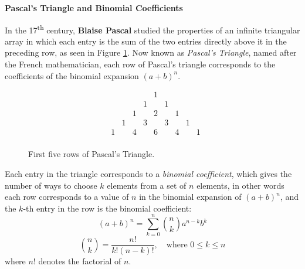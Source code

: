

\noindent \textbf{Pascal’s Triangle and Binomial Coefficients}
\vspace{0.5em}

In the 17\textsuperscript{th} century, \textbf{Blaise Pascal} studied the properties of an infinite triangular array in which each entry is the sum of the two entries directly above it in the preceding row, as seen in Figure \ref{fig:pascal_rows}. Now known as \textit{Pascal’s Triangle}, named after the French mathematician, each row of Pascal's triangle corresponds to the coefficients of the binomial expansion $(a + b)^n$.

\begin{figure}[H]
\centering
\[
\begin{array}{cccccccccc}
     &   &   &   &   & 1 &   &   &   &   \\
     &   &   &   & 1 &   & 1 &   &   &   \\
     &   &   & 1 &   & 2 &   & 1 &   &   \\
     &   & 1 &   & 3 &   & 3 &   & 1 &   \\
     & 1 &   & 4 &   & 6 &   & 4 &   & 1 \\
\end{array}
\]
\caption{First five rows of Pascal’s Triangle.}
\label{fig:pascal_rows}
\end{figure}

\vspace{-0.3cm}
Each entry in the triangle corresponds to a \textit{binomial coefficient}, which gives the number of ways to choose $k$ elements from a set of $n$ elements, in other words each row corresponds to a value of \(n\) in the binomial expansion of \((a + b)^n\), and the \(k\)-th entry in the row is the binomial coefficient:
\[
(a + b)^n = \sum_{k=0}^{n} \binom{n}{k} a^{n-k} b^k
\]
\[
\binom{n}{k} = \frac{n!}{k!(n-k)!}, \quad \text{where } 0 \leq k \leq n
\]
where $n!$ denotes the factorial of $n$.

